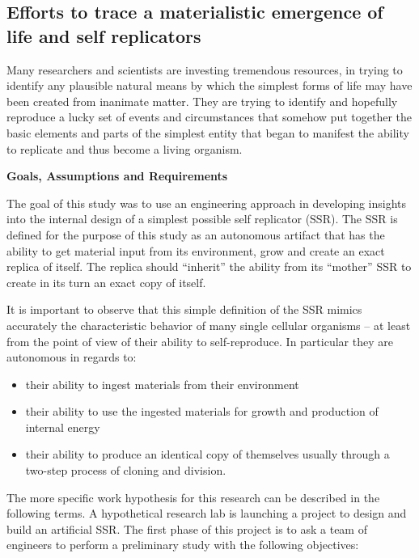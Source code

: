 \documentclass[letterpaper]{article}
\begin{document}
\bigskip

\subsection[Efforts to trace a materialistic emergence of life and self
replicators]{Efforts to trace a materialistic emergence of life and
self replicators}
\hypertarget{RefHeading3040306210128}{}Many researchers and scientists
are investing tremendous resources, in trying to identify any plausible
natural means by which the simplest forms of life may have been created
from inanimate matter. They are trying to identify and hopefully
reproduce a lucky set of events and circumstances that somehow put
together the basic elements and parts of the simplest entity that began
to manifest the ability to replicate and thus become a living organism.


\bigskip

{\bfseries
\hypertarget{RefHeading3042306210128}{}Goals, Assumptions and
Requirements}

The goal of this study was to use an engineering approach in developing
insights into the internal design of a simplest possible self
replicator (SSR). The SSR is defined for the purpose of this study as
an autonomous artifact that has the ability to get material input from
its environment, grow and create an exact replica of itself. The
replica should “inherit” the ability from its “mother” SSR to create in
its turn an exact copy of itself.


\bigskip

It is important to observe that this simple definition of the SSR mimics
accurately the characteristic behavior of many single cellular
organisms – at least from the point of view of their ability to
self-reproduce. In particular they are autonomous in regards to:


\bigskip

\begin{itemize}
\item their ability to ingest materials from their environment
\item their ability to use the ingested materials for growth and
production of internal energy
\item their ability to produce an identical copy of themselves usually
through a two-step process of cloning and division.
\end{itemize}
The more specific work hypothesis for this research can be described in
the following terms. A hypothetical research lab is launching a project
to design and build an artificial SSR. The first phase of this project
is to ask a team of engineers to perform a preliminary study with the
following objectives:
\end{document}
